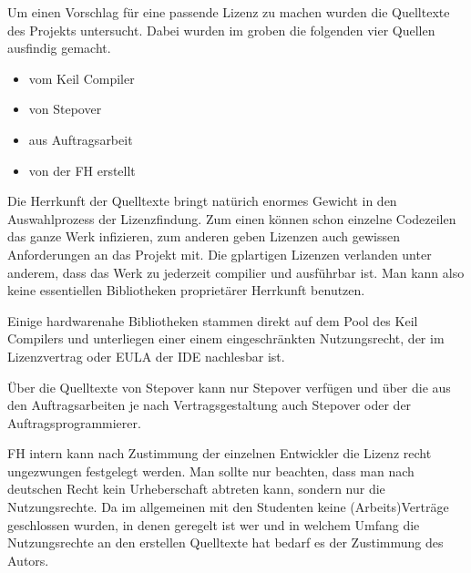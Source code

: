 Um einen Vorschlag für eine passende Lizenz zu machen wurden die Quelltexte des Projekts untersucht.
Dabei wurden im groben die folgenden vier Quellen ausfindig gemacht.
\begin{itemize}
	\item vom Keil Compiler
	\item von Stepover
	\item aus Auftragsarbeit
	\item von der FH erstellt
\end{itemize}


\noindent Die Herrkunft der Quelltexte bringt natürich enormes Gewicht in den Auswahlprozess der Lizenzfindung.
Zum einen können schon einzelne Codezeilen das ganze Werk infizieren, zum anderen geben Lizenzen auch gewissen Anforderungen an das Projekt mit. Die gplartigen Lizenzen verlanden unter anderem, dass das Werk zu jederzeit compilier und ausführbar ist. Man kann also keine essentiellen Bibliotheken proprietärer Herrkunft benutzen.


\noindent Einige hardwarenahe Bibliotheken stammen direkt auf dem Pool des Keil Compilers und unterliegen einer einem eingeschränkten Nutzungsrecht, der im Lizenzvertrag oder EULA der IDE nachlesbar ist.


\noindent Über die Quelltexte von Stepover kann nur Stepover verfügen und über die aus den Auftragsarbeiten je nach Vertragsgestaltung auch Stepover oder der Auftragsprogrammierer.


\noindent FH intern kann nach Zustimmung der einzelnen Entwickler die Lizenz recht ungezwungen festgelegt werden. Man sollte nur beachten, dass man nach deutschen Recht kein Urheberschaft abtreten kann, sondern nur die Nutzungsrechte. Da im allgemeinen mit den Studenten keine (Arbeits)Verträge geschlossen wurden, in denen geregelt ist wer und in welchem Umfang die Nutzungsrechte an den erstellen Quelltexte hat bedarf es der Zustimmung des Autors.
